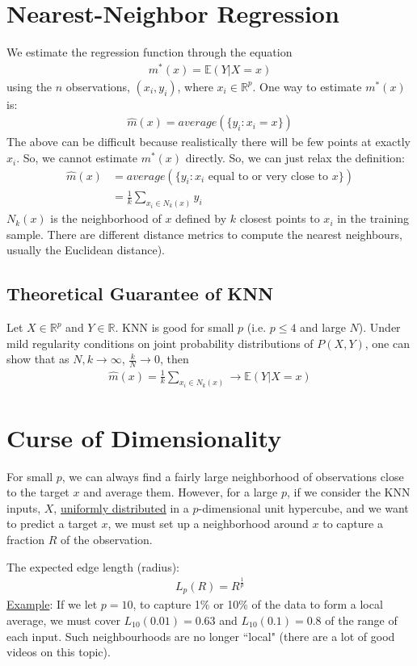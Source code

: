 \documentclass{article}
\newcommand{\E}{\mathbb{E}}
\newcommand{\R}{\mathbb{R}}
\begin{document}
\section{Nearest-Neighbor Regression}
We estimate the regression function through the equation
\begin{align}
    m^*(x) = \E(Y | X = x)
\end{align}
using the $n$ observations, $(x_i,y_i)$, where $x_i \in \R^p$. One way to estimate $m^*(x)$ is:
\begin{align}
    \hat{m}(x) = average(\{y_i : x_i = x\})
\end{align}
The above can be difficult because realistically there will be few points at exactly $x_i$. So, we cannot estimate $m^*(x)$ directly. So, we can just relax the definition:
\begin{align*}
    \hat{m}(x) &= average(\{y_i : x_i \text{ equal to or very close to } x\}) \\
    &= \frac{1}{k}\sum_{x_i \in N_k(x)}y_i
\end{align*}
$N_k(x)$ is the neighborhood of $x$ defined by $k$ closest points to $x_i$ in the training sample. There are different distance metrics to compute the nearest neighbours, usually the Euclidean distance).
\subsection{Theoretical Guarantee of KNN}
Let $X \in \R^p$ and $Y \in \R$. KNN is good for small $p$ (i.e. $p \leq 4$ and large $N$). Under mild regularity conditions on joint probability distributions of $P(X,Y)$, one can show that as $N,k \rightarrow \infty$, $\frac{k}{N} \rightarrow 0$, then
\begin{align}
    \hat{m}(x) = \frac{1}{k}\sum_{x_i \in N_k(x)} \rightarrow \E(Y|X = x)
\end{align}
\section{Curse of Dimensionality}
For small $p$, we can always find a fairly large neighborhood of observations close to the target $x$ and average them. However, for a large $p$, if we consider the KNN inputs, $X$, \underline{uniformly distributed} in a $p$-dimensional unit hypercube, and we want to predict a target $x$, we must set up a neighborhood around $x$ to capture a fraction $R$ of the observation.

The expected edge length (radius):
\begin{align}
    L_p(R) = R^{\frac{1}{p}}
\end{align}
\underline{Example}: If we let $p=10$, to capture 1\% or 10\% of the data to form a local average, we must cover $L_{10}(0.01) = 0.63$ and $L_{10}(0.1) = 0.8$ of the range of each input. Such neighbourhoods are no longer ``local" (there are a lot of good videos on this topic).
\end{document}
